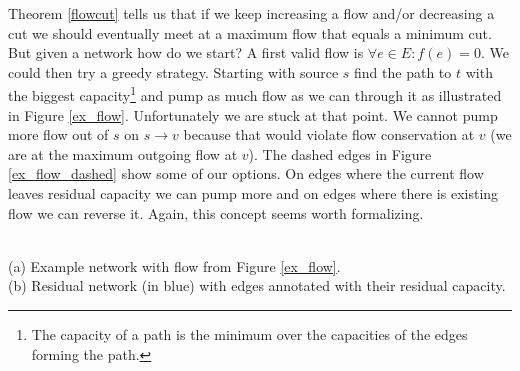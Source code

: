 Theorem \ref{flowcut} tells us that if we keep increasing a flow and/or decreasing a cut we should eventually meet at a maximum flow that equals a minimum cut. But given a network how do we start? A first valid flow is $\forall e \in E: f(e) = 0$. We could then try a greedy strategy. Starting with source $s$ find the path to $t$ with the biggest capacity\footnote{The capacity of a path is the minimum over the capacities of the edges forming the path.} and pump as much flow as we can through it as illustrated in Figure \ref{ex_flow}. Unfortunately we are stuck at that point. We cannot pump more flow out of $s$ on $s \rightarrow v$ because that would violate flow conservation at $v$ (we are at the maximum outgoing flow at $v$). The dashed edges in Figure \ref{ex_flow_dashed} show some of our options. On edges where the current flow leaves residual capacity we can pump more and on edges where there is existing flow we can reverse it. Again, this concept seems worth formalizing.

\begin{marginfigure}
    \caption{\\
             (a) Example network with flow from Figure \ref{ex_flow}. \\
             (b) Residual network (in blue) with edges annotated with their residual capacity.}
	\label{ex_residual}
\end{marginfigure}

